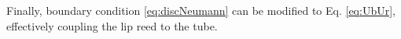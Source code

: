 Finally, boundary condition \eqref{eq:discNeumann} can be modified to Eq. \eqref{eq:UbUr}, effectively coupling the lip reed to the tube. 

